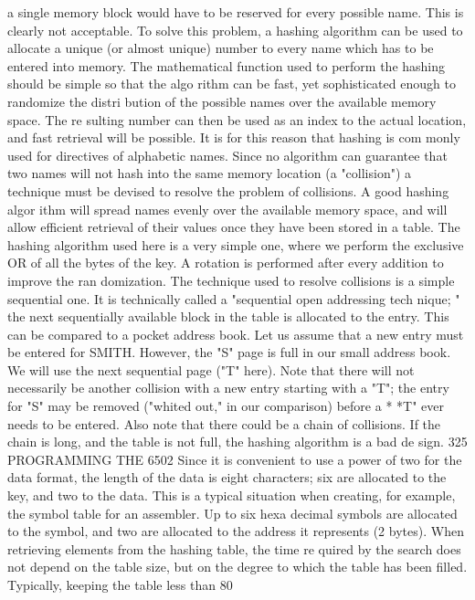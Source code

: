 {{{{{{{{{{{{{{{{{{{{{{{{{{{{{{{{{{{{{{{{{{{{{{{{{{{{{{{{{{{{{{{{{{{{{{{{{{{{{{{{{{{{{{{{{{a single memory block would have to be reserved for every possible
name. This is clearly not acceptable. To solve this problem, a hashing
algorithm can be used to allocate a unique (or almost unique) number
to every name which has to be entered into memory. The mathematical
function used to perform the hashing should be simple so that the algo
rithm can be fast, yet sophisticated enough to randomize the distri
bution of the possible names over the available memory space. The re
sulting number can then be used as an index to the actual location, and
fast retrieval will be possible. It is for this reason that hashing is com
monly used for directives of alphabetic names.
Since no algorithm can guarantee that two names will not hash
into the same memory location (a "collision") a technique must be
devised to resolve the problem of collisions. A good hashing algor
ithm will spread names evenly over the available memory space,
and will allow efficient retrieval of their values once they have been
stored in a table. The hashing algorithm used here is a very simple
one, where we perform the exclusive OR of all the bytes of the key.
A rotation is performed after every addition to improve the ran
domization.
The technique used to resolve collisions is a simple sequential
one. It is technically called a "sequential open addressing tech
nique; " the next sequentially available block in the table is
allocated to the entry. This can be compared to a pocket address
book. Let us assume that a new entry must be entered for SMITH.
However, the "S" page is full in our small address book. We will
use the next sequential page ("T" here). Note that there will not
necessarily be another collision with a new entry starting with a "T";
the entry for "S" may be removed ("whited out," in our comparison)
before a * *T" ever needs to be entered.
Also note that there could be a chain of collisions. If the chain is
long, and the table is not full, the hashing algorithm is a bad de
sign.
325
PROGRAMMING THE 6502
Since it is convenient to use a power of two for the data format,
the length of the data is eight characters; six are allocated to the
key, and two to the data. This is a typical situation when creating,
for example, the symbol table for an assembler. Up to six hexa
decimal symbols are allocated to the symbol, and two are allocated
to the address it represents (2 bytes).
When retrieving elements from the hashing table, the time re
quired by the search does not depend on the table size, but on the
degree to which the table has been filled. Typically, keeping the
table less than 80%
}}}}}}}}}}}}}}}}}}}}}}}}}}}}}}}}}}}}}}}}}}}}}}}}}}}}}}}}}}}}}}}}}}}}}}}}}}}}}}}}}}}}}}}}}}
